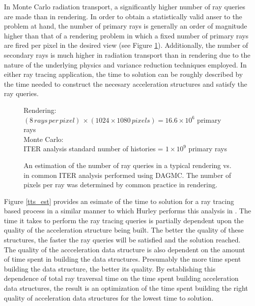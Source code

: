 \documentclass[12pt, a4paper]{article}
\begin{document}
In Monte Carlo radiation transport, a significantly higher number of ray queries are made than in rendering. In order to obtain a statistically valid anser to the problem at hand, the number of primary rays is generally an order of magnitude higher than that of a rendering problem in which a fixed number of primary rays are fired per pixel in the desired view (see Figure \ref{render_ray_estimate}). Additionally, the number of secondary rays is much higher in radiation transport than in rendering due to the nature of the underlying physics and variance reduction techniques employed. In either ray tracing application, the time to solution can be roughly described by the time needed to construct the necesary acceleration structures and satisfy the ray queries.

\begin{figure}[H]
  \centering
  Rendering: \\
  $ (8\, rays\, per\, pixel)\, \times (1024 \times 1080\, pixels) = 16.6 \times 10^6 $ primary rays \\
  Monte Carlo: \\
  ITER analysis standard number of histories = $ 1 \times 10^9 $ primary rays
  \caption{An  estimation of the number of ray queries in a typical rendering vs. in common ITER analysis performed using DAGMC. The number of pixels per ray was determined by common practice in rendering.}
  \label{render_ray_estimate}
\end{figure}

Figure \ref{tts_est} provides an esimate of the time to solution for a ray tracing based process in a similar manner to which Hurley performs this analysis in \cite{Hurley_2002}. The time it takes to perform the ray tracing queries is partially dependent upon the quality of the acceleration structure being built. The better the quality of these structures, the faster the ray queries will be satisfied and the solution reached. The quality of the accceleration data structure is also dependent on the amount of time spent in building the data structures. Presumably the more time spent building the data structure, the better its quality. By establishing this dependence of total ray traversal time on the time spent building acceleration data structures, the result is an optimization of the time spent building the right quality of acceleration data structures for the lowest time to solution. 
\end{document}

